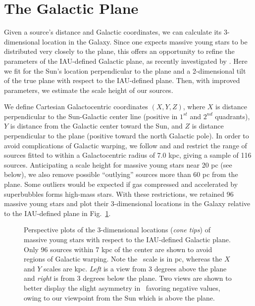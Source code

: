 \documentclass[12pt,preprint]{aastex}
\def\ZIAU  {\ifmmode {Z_{IAU}}\else {$Z_{IAU}$}\fi}
\begin{document}
\section{The Galactic Plane}\label{sect:GalacticPlane}

Given a source's distance and Galactic coordinates, we can calculate its 
3-dimensional location in the Galaxy.  Since one expects massive young stars to be
distributed very closely to the plane, this offers an opportunity to
refine the parameters of the IAU-defined Galactic plane, as recently investigated
by \citet{Anderson:19}.  Here we fit for the Sun's location perpendicular to the 
plane and a 2-dimensional tilt of the true plane with respect to the IAU-defined plane.  
Then, with improved parameters, we estimate the scale height of our sources.

We define Cartesian Galactocentric coordinates $(X,Y,Z)$, where $X$ is 
distance perpendicular to the Sun-Galactic center line (positive in 
$1^{st}$ and $2^{nd}$ quadrants), $Y$ is distance from the Galactic center toward 
the Sun, and $Z$ is distance perpendicular to the plane (positive toward the north 
Galactic pole).  In order to avoid complications of Galactic warping, 
we follow \citet{Gum:60} and  \citet{Blaauw:60} and 
restrict the range of sources fitted to within a Galactocentric radius of 
7.0 kpc, giving a sample of 116 sources.  
Anticipating a scale height for massive young stars near 20 pc (see below), 
we also remove possible ``outlying'' sources more than 60 pc from the plane.  Some
outliers would be expected if gas compressed and accelerated by superbubbles 
forms high-mass stars.  
With these restrictions, we retained 96 massive young stars and plot their 
3-dimensional locations in the Galaxy relative to the IAU-defined plane in 
Fig.~\ref{fig:IAU_Zs}.  

\begin{figure}[ht]
\caption{\small Perspective plots of the 3-dimensional locations 
({\it cone tips}) of massive young stars with respect to the 
IAU-defined Galactic plane.  Only 96 sources within 7 kpc of the center 
are shown to avoid regions of Galactic warping.  
Note the \ZIAU\ scale is in pc, whereas the $X$ and $Y$ scales are kpc. 
{\it Left} is a view from 3 degrees above the plane and {\it right} is
from 3 degrees below the plane.  Two views are shown to better display the
slight asymmetry in \ZIAU\ favoring negative values, owing to our viewpoint
from the Sun which is above the plane.
        }
\label{fig:IAU_Zs}
\end{figure}
\end{document}
